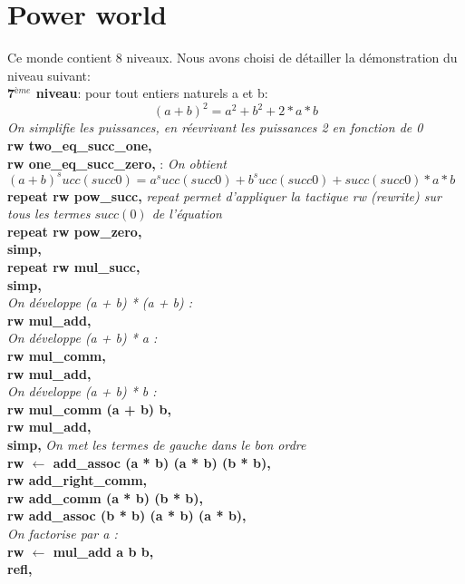 \documentclass{article}
\begin{document}
\section{Power world}
Ce monde contient 8 niveaux. 
Nous avons choisi de détailler la démonstration du niveau suivant: \\
\textbf{7$^{ème}$ niveau}:
pour tout entiers naturels a et b:$$ (a+b)^2=a^2+b^2+2*a*b $$
 \textit{On simplifie les puissances, en réevrivant les puissances 2 en fonction de 0 }\\
  \textbf{rw two\_eq\_succ\_one,} \\
 \textbf{rw one\_eq\_succ\_zero,} : \textit{ On obtient $(a + b) ^ succ (succ 0) = a ^ succ (succ 0) + b ^ succ (succ 0) + succ (succ 0) * a * b$}\\
  \textbf{repeat {rw pow\_succ},} \textit{repeat permet d'appliquer la tactique rw (rewrite) sur tous les termes $succ(0)$ de l'équation} \\
  \textbf{repeat {rw pow\_zero},} \\
  \textbf{simp,} \\
  \textbf{repeat {rw mul\_succ},} \\
  \textbf{simp,} \\
  \textit{On développe (a + b) * (a + b) :} \\
 \textbf{rw mul\_add,} \\
 \textit{On développe (a + b) * a :}\\
  \textbf{rw mul\_comm,} \\
  \textbf{rw mul\_add,} \\
  \textit{On développe (a + b) * b :} \\
 \textbf{ rw mul\_comm (a + b) b,} \\
  \textbf{rw mul\_add,} \\
 \textbf{simp,}  \textit{On met les termes de gauche dans le bon ordre } \\
  \textbf{rw $\leftarrow$ add\_assoc (a * b) (a * b) (b * b),}\\
  \textbf{rw add\_right\_comm,} \\
  \textbf{rw add\_comm (a * b) (b * b),} \\
  \textbf{rw add\_assoc (b * b) (a * b) (a * b),}\\
  \textit{On factorise par a :}\\
  \textbf{rw $\leftarrow$ mul\_add a b b,}\\
  \textbf{refl,}\\
\end{document}
